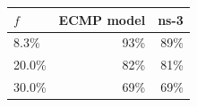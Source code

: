 \begin{tabular}{@{}lrr@{}}
\toprule
$f$ & ECMP model & ns-3 \\
\midrule
8.3\% & 93\% & 89\% \\
20.0\% & 82\% & 81\% \\
30.0\% & 69\% & 69\% \\
\bottomrule
\end{tabular}
